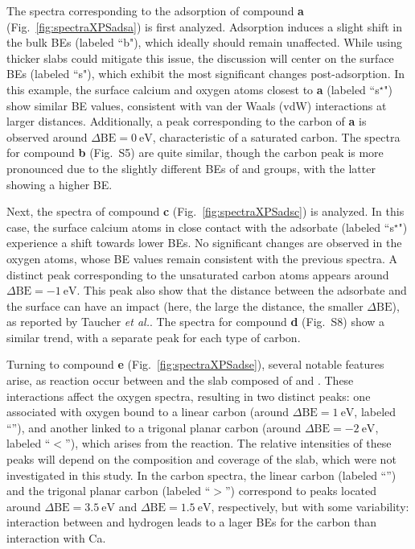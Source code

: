 \documentclass[journal=jpccck,manuscript=article]{achemso}
\def\dbe{\ensuremath{\Delta\text{BE}}}
\begin{document}
The spectra corresponding to the adsorption of compound \textbf{a} (Fig.~\ref{fig:spectraXPSadsa}) is first analyzed. Adsorption induces a slight shift in the bulk BEs (labeled ``b"), which ideally should remain unaffected. While using thicker slabs could mitigate this issue, the discussion will center on the surface BEs (labeled ``s"), which exhibit the most significant changes post-adsorption. In this example, the surface calcium and oxygen atoms closest to \textbf{a} (labeled ``s$^\star$") show similar BE values, consistent with van der Waals (vdW) interactions at larger distances. Additionally, a peak corresponding to the carbon of \textbf{a} is observed around $\dbe = \SI{0}{\electronvolt}$, characteristic of a saturated carbon. The spectra for compound \textbf{b} (Fig.~S5) are quite similar, though the carbon peak is more pronounced due to the slightly different BEs of  and  groups, with the latter showing a higher BE.


\clearpage

Next, the spectra of compound \textbf{c} (Fig.~\ref{fig:spectraXPSadsc}) is analyzed. In this case, the surface calcium atoms in close contact with the adsorbate (labeled ``s$^\star$") experience a shift towards lower BEs. No significant changes are observed in the oxygen atoms, whose BE values remain consistent with the previous spectra. A distinct peak corresponding to the unsaturated carbon atoms appears around $\dbe = \SI{-1}{\electronvolt}$. This peak also show that the distance between the adsorbate and the surface can have an impact (here, the large the distance, the smaller \dbe{}), as reported by Taucher \emph{et al.}\cite{taucherFinalStateSimulationsCoreLevel2020}. The spectra for compound \textbf{d} (Fig.~S8) show a similar trend, with a separate peak for each type of carbon.


Turning to compound \textbf{e} (Fig.~\ref{fig:spectraXPSadse}), several notable features arise, as reaction occur between  and the slab composed of  and . These interactions affect the oxygen spectra, resulting in two distinct peaks: one associated with oxygen bound to a linear carbon (around $\dbe = \SI{1}{\electronvolt}$, labeled ``''), and another linked to a trigonal planar carbon (around $\dbe = \SI{-2}{\electronvolt}$, labeled ``$<$''), which arises from the reaction. The relative intensities of these peaks will depend on the composition and coverage of the slab, which were not investigated in this study. In the carbon spectra, the linear carbon (labeled ``'') and the trigonal planar carbon (labeled ``$>$'') correspond to peaks located around $\dbe = \SI{3.5}{\electronvolt}$ and $\dbe = \SI{1.5}{\electronvolt}$, respectively, but with some variability: interaction between  and hydrogen leads to a lager BEs for the carbon than interaction with Ca. 
\end{document}
